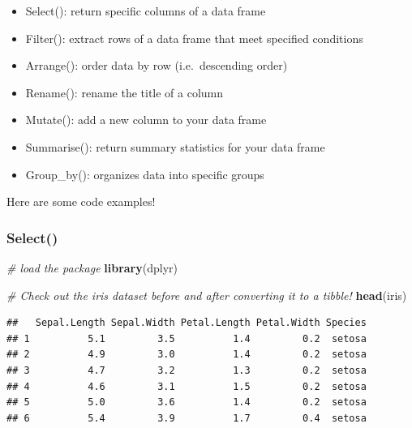 \documentclass[
]{article}
\newenvironment{Shaded}{\begin{snugshade}}{\end{snugshade}}
\newcommand{\CommentTok}[1]{\textcolor[rgb]{0.56,0.35,0.01}{\textit{#1}}}
\newcommand{\KeywordTok}[1]{\textcolor[rgb]{0.13,0.29,0.53}{\textbf{#1}}}
\newcommand{\NormalTok}[1]{#1}
\newcommand{\OperatorTok}[1]{\textcolor[rgb]{0.81,0.36,0.00}{\textbf{#1}}}
\newcommand{\StringTok}[1]{\textcolor[rgb]{0.31,0.60,0.02}{#1}}
\providecommand{\tightlist}{%
  \setlength{\itemsep}{0pt}\setlength{\parskip}{0pt}}
\begin{document}
\begin{itemize}
\tightlist
\item
  Select(): return specific columns of a data frame
\item
  Filter(): extract rows of a data frame that meet specified conditions
\item
  Arrange(): order data by row (i.e.~descending order)
\item
  Rename(): rename the title of a column
\item
  Mutate(): add a new column to your data frame
\item
  Summarise(): return summary statistics for your data frame
\item
  Group\_by(): organizes data into specific groups
\end{itemize}

Here are some code examples!

\hypertarget{select}{%
\subsubsection{Select()}\label{select}}

\begin{Shaded}
\begin{Highlighting}[]
\CommentTok{# load the package}
\KeywordTok{library}\NormalTok{(dplyr)}

\CommentTok{# Check out the iris dataset before and after converting it to a tibble!}
\KeywordTok{head}\NormalTok{(iris)}
\end{Highlighting}
\end{Shaded}

\begin{verbatim}
##   Sepal.Length Sepal.Width Petal.Length Petal.Width Species
## 1          5.1         3.5          1.4         0.2  setosa
## 2          4.9         3.0          1.4         0.2  setosa
## 3          4.7         3.2          1.3         0.2  setosa
## 4          4.6         3.1          1.5         0.2  setosa
## 5          5.0         3.6          1.4         0.2  setosa
## 6          5.4         3.9          1.7         0.4  setosa
\end{verbatim}

\begin{Shaded}
\end{Shaded}
\end{document}
